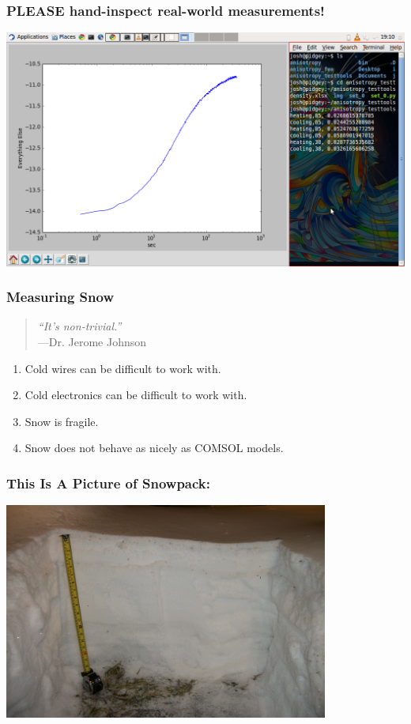 \documentclass{beamer}
\begin{document}
\begin{frame}
\frametitle{PLEASE hand-inspect real-world measurements!}
\begin{center}
\includegraphics[width=\textwidth]{fig/measurement_screenie.png}
\end{center}
\end{frame}


\begin{frame}
\frametitle{Measuring Snow}
\begin{quotation}
  {\it ``It's non-trivial.''} \\ 
  \hspace*{1in}---Dr. Jerome Johnson
\end{quotation}
\begin{enumerate}
\item Cold wires can be difficult to work with.
\item Cold electronics can be difficult to work with.
\item Snow is fragile.
\item Snow does not behave as nicely as COMSOL models.
\end{enumerate}
\end{frame}

\begin{frame}
\frametitle{This Is A Picture of Snowpack:}
\includegraphics[width=0.8\textwidth]{fig/snowpack.jpg}
\end{frame}
\end{document}
